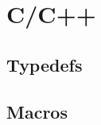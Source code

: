 \documentclass[notebook.tex]{subfiles}
\begin{document}
\section{C/C++}

\subsection{Typedefs}


\subsection{Macros}

\end{document}
